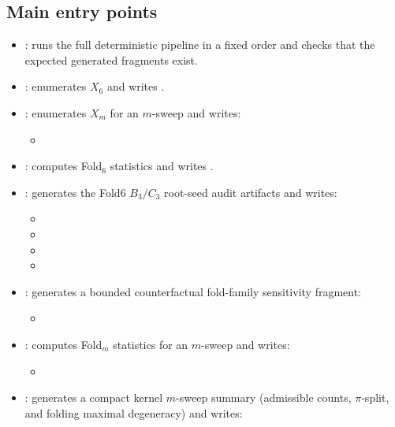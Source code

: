 \subsection{Main entry points}
\begin{sloppypar}
\begin{itemize}
\item {}: runs the full deterministic pipeline in a fixed order and checks that the expected generated fragments exist.
\item {}: enumerates $X_6$ and writes .
\item {}: enumerates $X_m$ for an $m$-sweep and writes:
\begin{itemize}
\item {}
\end{itemize}
\item {}: computes Fold$_6$ statistics and writes .
\item {}: generates the Fold6 $B_3/C_3$ root-seed audit artifacts and writes:
\begin{itemize}
\item {}
\item {}
\item {}
\item {}
\end{itemize}
\item {}: generates a bounded counterfactual fold-family sensitivity fragment:
\begin{itemize}
\item {}
\end{itemize}
\item {}: computes Fold$_m$ statistics for an $m$-sweep and writes:
\begin{itemize}
\item {}
\end{itemize}
\item {}: generates a compact kernel $m$-sweep summary (admissible counts, $\pi$-split, and folding maximal degeneracy) and writes:

\end{itemize}
\end{sloppypar}
